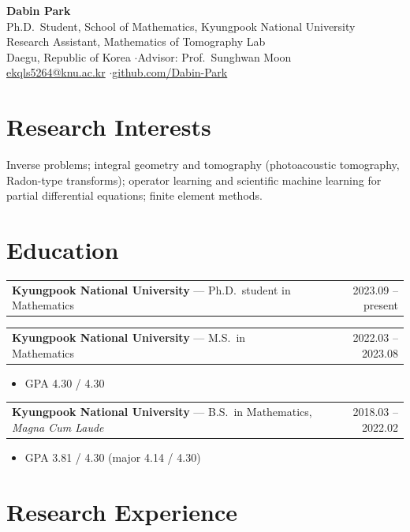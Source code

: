 \documentclass[11pt,a4paper]{article}
\makeatletter
\newcommand{\entry}[2]{\noindent\begin{tabularx}{\textwidth}{@{}Xr@{}}#1 & #2\end{tabularx}\par}
\makeatother
\begin{document}
\begin{center}
  {\LARGE\bfseries Dabin Park}\\[0.35em]
  {\normalsize Ph.D.\ Student, School of Mathematics, Kyungpook National University}\\[0.2em]
  {\normalsize Research Assistant, Mathematics of Tomography Lab}\\[0.2em]
  {\small Daegu, Republic of Korea \quad$\cdot$\quad Advisor: Prof.\ Sunghwan Moon}\\[0.2em]
  {\small \href{mailto:ekqls5264@knu.ac.kr}{ekqls5264@knu.ac.kr} \quad$\cdot$\quad \href{https://github.com/Dabin-Park}{github.com/Dabin-Park}}
\end{center}

\vspace{0.5em}

\section{Research Interests}

Inverse problems; integral geometry and tomography (photoacoustic tomography, Radon-type transforms);
operator learning and scientific machine learning for partial differential equations; finite element methods.

\section{Education}

\entry{\textbf{Kyungpook National University} --- Ph.D.\ student in Mathematics}{2023.09 -- present}
\vspace{0.4em}
\entry{\textbf{Kyungpook National University} --- M.S.\ in Mathematics}{2022.03 -- 2023.08}
\begin{itemize}[nosep]
  \item GPA 4.30 / 4.30
\end{itemize}
\vspace{0.4em}
\entry{\textbf{Kyungpook National University} --- B.S.\ in Mathematics, \textit{Magna Cum Laude}}{2018.03 -- 2022.02}
\begin{itemize}[nosep]
  \item GPA 3.81 / 4.30 (major 4.14 / 4.30)
\end{itemize}

\section{Research Experience}
\end{document}

